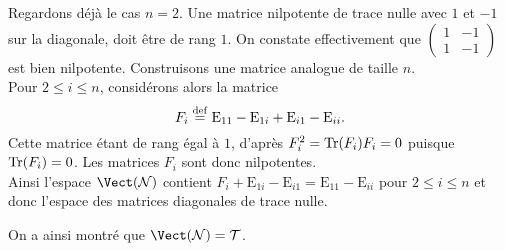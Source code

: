 \begin{solution}
\begin{itemize}
        Regardons déjà le cas $n = 2$. Une matrice nilpotente de trace nulle avec $1$ et $-1$ sur la diagonale, doit être de rang $1$. On constate effectivement que $\begin{pmatrix} 1 & -1 \\ 1 & -1 \end{pmatrix}$ est bien nilpotente. Construisons une matrice analogue de taille $n$. \\
        Pour $2 \leqslant i \leqslant n$, considérons alors la matrice
        $$F_i \overset{\mathrm{\tiny def}}{=} \mathrm{E}_{11} - \mathrm{E}_{1i} + \mathrm{E}_{i1} - \mathrm{E}_{ii}.$$
        Cette matrice étant de rang égal à $1$, d'après  $F_i^2 = \Tr (F_i) F_i = 0$ puisque $\Tr(F_i) = 0$. Les matrices $F_i$ sont donc nilpotentes. \\
        Ainsi l'espace $\Vect(\mathcal{N})$ contient $F_i + \mathrm{E}_{1i} - \mathrm{E}_{i1} = \mathrm{E}_{11}-\mathrm{E}_{ii}$ pour $2 \leqslant i \leqslant n$ et donc l'espace des matrices diagonales de trace nulle. 
    \end{itemize}
    On a ainsi montré que $\Vect(\mathcal{N}) = \mathcal{T}$.
\end{solution}

\marginnote[-7cm]{
    \[
    F_i=
    \begin{pmatrix}
        1 & 0 & \cdots & 0 & -1 & 0 & \cdots & 0 \\
        0 & & & & 0 & & & 0 \\
        \vdots & & & & \vdots & & & \vdots \\
        0 & & & & 0 & & & 0 \\
        1 & 0 & \cdots & 0 & -1 & 0 & \cdots & 0 \\
        0 & & & & 0 & & & 0 \\
        \vdots & & & & \vdots & & & \vdots \\
        0 & & \cdots & & 0 & & \cdots & 0 \\
    \end{pmatrix}
    \]
}